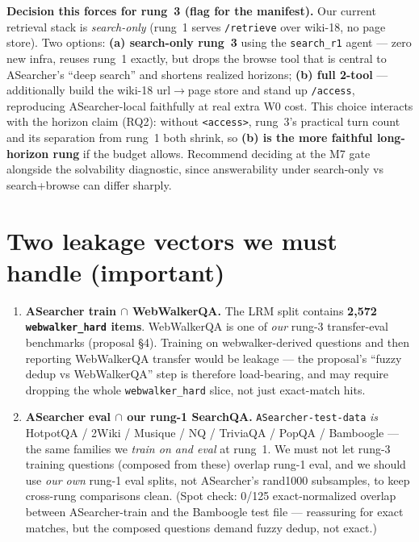 \documentclass[10pt]{article}
\newcommand{\cmd}[1]{\texttt{\small #1}}
\begin{document}
\noindent\textbf{Decision this forces for rung~3 (flag for the manifest).} Our current retrieval stack is
\emph{search-only} (rung~1 serves \cmd{/retrieve} over wiki-18, no page store). Two options:
\textbf{(a) search-only rung~3} using the \cmd{search\_r1} agent --- zero new infra, reuses rung~1 exactly,
but drops the browse tool that is central to ASearcher's ``deep search'' and shortens realized horizons;
\textbf{(b) full 2-tool} --- additionally build the wiki-18 url$\to$page store and stand up \cmd{/access},
reproducing ASearcher-local faithfully at real extra W0 cost. This choice interacts with the horizon claim
(RQ2): without \cmd{<access>}, rung~3's practical turn count and its separation from rung~1 both shrink, so
\textbf{(b) is the more faithful long-horizon rung} if the budget allows. Recommend deciding at the M7 gate
alongside the solvability diagnostic, since answerability under search-only vs search+browse can differ
sharply.

\section{Two leakage vectors we must handle (important)}
\begin{enumerate}
\item \textbf{ASearcher train $\cap$ WebWalkerQA.} The LRM split contains \textbf{2{,}572
\cmd{webwalker\_hard} items}. WebWalkerQA is one of \emph{our} rung-3 transfer-eval benchmarks (proposal
§4). Training on webwalker-derived questions and then reporting WebWalkerQA transfer would be leakage ---
the proposal's ``fuzzy dedup vs WebWalkerQA'' step is therefore load-bearing, and may require dropping the
whole \cmd{webwalker\_hard} slice, not just exact-match hits.
\item \textbf{ASearcher eval $\cap$ our rung-1 SearchQA.} \cmd{ASearcher-test-data} \emph{is}
HotpotQA / 2Wiki / Musique / NQ / TriviaQA / PopQA / Bamboogle --- the same families we \emph{train on and
eval} at rung~1. We must not let rung-3 training questions (composed from these) overlap rung-1 eval, and
we should use \emph{our own} rung-1 eval splits, not ASearcher's rand1000 subsamples, to keep cross-rung
comparisons clean. (Spot check: 0/125 exact-normalized overlap between ASearcher-train and the Bamboogle
test file --- reassuring for exact matches, but the composed questions demand fuzzy dedup, not exact.)
\end{enumerate}
\end{document}
